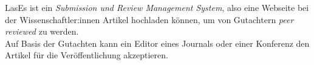 
LasEs ist ein \emph{Submission und Review Management System}, also eine Webseite bei der Wissenschaftler:innen Artikel hochladen können, um von Gutachtern \emph{peer reviewed} zu werden.\\
Auf Basis der Gutachten kann ein Editor eines Journals oder einer Konferenz den Artikel für die Veröffentlichung akzeptieren.
